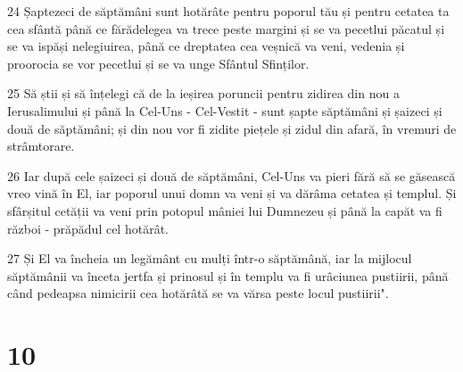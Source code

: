 \par 24 Șaptezeci de săptămâni sunt hotărâte pentru poporul tău și pentru cetatea ta cea sfântă până ce fărădelegea va trece peste margini și se va pecetlui păcatul și se va ispăși nelegiuirea, până ce dreptatea cea veșnică va veni, vedenia și proorocia se vor pecetlui și se va unge Sfântul Sfinților.
\par 25 Să știi și să înțelegi că de la ieșirea poruncii pentru zidirea din nou a Ierusalimului și până la Cel-Uns - Cel-Vestit - sunt șapte săptămâni și șaizeci și două de săptămâni; și din nou vor fi zidite piețele și zidul din afară, în vremuri de strâmtorare.
\par 26 Iar după cele șaizeci și două de săptămâni, Cel-Uns va pieri fără să se găsească vreo vină în El, iar poporul unui domn va veni și va dărâma cetatea și templul. Și sfârșitul cetății va veni prin potopul mâniei lui Dumnezeu și până la capăt va fi război - prăpădul cel hotărât.
\par 27 Și El va încheia un legământ cu mulți într-o săptămână, iar la mijlocul săptămânii va înceta jertfa și prinosul și în templu va fi urâciunea pustiirii, până când pedeapsa nimicirii cea hotărâtă se va vărsa peste locul pustiirii".

\chapter{10}


